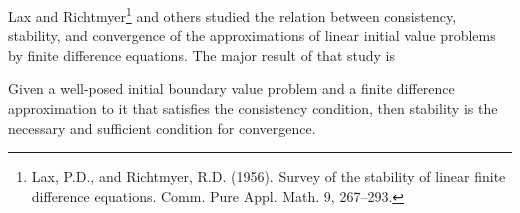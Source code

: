 Lax and Richtmyer\footnote{Lax, P.D., and Richtmyer, R.D. (1956). Survey of the stability of linear finite difference equations. Comm. Pure Appl. Math. 9, 267–293.
} and others studied the relation between consistency, stability,
and convergence of the approximations of linear initial value problems by
finite difference equations. The major result of that study is
\begin{theorem}
Given a well-posed initial boundary value problem and a finite
difference approximation to it that satisfies the consistency condition, then
stability is the necessary and sufficient condition for convergence.
\end{theorem}
